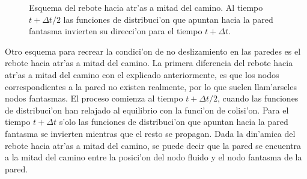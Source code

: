 \begin{figure}
\centering
%
\caption{\label{fig:halfway}
Esquema del rebote hacia atr'as a mitad del camino. Al tiempo $t + \Delta t/2$ las funciones
de distribuci'on  que apuntan hacia la pared fantasma invierten su direcci'on para el tiempo 
$t+\Delta t$. 
}
\end{figure}



Otro esquema para recrear la condici'on de no deslizamiento en las paredes es el rebote hacia atr'as
a mitad del camino. La primera diferencia del rebote hacia atr'as a mitad del camino con el explicado
anteriormente, es que los nodos correspondientes a la pared no existen realmente, por lo que suelen
llam'arseles nodos fantasmas. El proceso comienza al tiempo $t + \Delta t /2$, cuando las funciones de
distribuci'on han relajado al equilibrio con la funci'on de colisi'on. Para el tiempo 
$t + \Delta t$ s'olo las funciones de distribuci'on que apuntan hacia la pared fantasma se invierten
mientras que el resto se propagan. Dada la din'amica del rebote hacia atr'as a mitad del camino,
se puede decir que la pared se encuentra a la mitad del camino entre la posici'on del nodo fluido
y el nodo fantasma de la pared.


